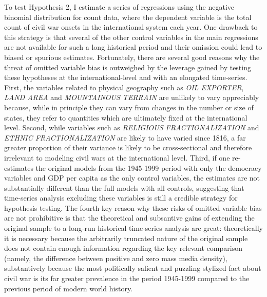 \documentclass[11pt,article,oneside]{memoir}
\begin{document}
To test Hypothesis 2, I estimate a series of regressions using the
negative binomial distribution for count data, where the dependent
variable is the total count of civil war onsets in the international
system each year. One drawback to this strategy is that several of the
other control variables in the main regressions are not available for
such a long historical period and their omission could lead to biased or
spurious estimates. Fortunately, there are several good reasons why the
threat of omitted variable bias is outweighed by the leverage gained by
testing these hypotheses at the international-level and with an
elongated time-series. First, the variables related to physical
geography such as \emph{OIL EXPORTER}, \emph{LAND AREA} and
\emph{MOUNTAINOUS TERRAIN} are unlikely to vary appreciably because,
while in principle they can vary from changes in the number or size of
states, they refer to quantities which are ultimately fixed at the
international level. Second, while variables such as \emph{RELIGIOUS
FRACTIONALIZATION} and \emph{ETHNIC FRACTIONALIZATION} are likely to
have varied since 1816, a far greater proportion of their variance is
likely to be cross-sectional and therefore irrelevant to modeling civil
wars at the international level. Third, if one re-estimates the original
models from the 1945-1999 period with only the democracy variables and
GDP per capita as the only control variables, the estimates are not
substantially different than the full models with all controls,
suggesting that time-series analysis excluding these variables is still
a credible strategy for hypothesis testing. The fourth key reason why
these risks of omitted variable bias are not prohibitive is that the
theoretical and subsantive gains of extending the original sample to a
long-run historical time-series analysis are great: theoretically it is
necessary because the arbitrarily truncated nature of the original
sample does not contain enough information regarding the key relevant
comparison (namely, the difference between positive and zero mass media
density), substantively because the most politically salient and
puzzling stylized fact about civil war is its far greater prevalence in
the period 1945-1999 compared to the previous period of modern world
history.
\end{document}
